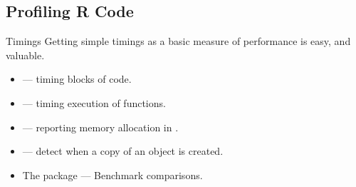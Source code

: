 \subsection{Profiling R Code}
\makesubcontentsslidessec


\begin{frame}
  \begin{block}{Timings}
  Getting simple timings as a basic measure of performance is easy, and 
valuable.
  \begin{itemize}
    \item {} --- timing blocks of code.
    \item {} --- timing execution of \R functions.
    \item {} --- reporting memory allocation in \R.
    \item {} --- detect when a copy of an \R object is created.
    \item The  package --- Benchmark comparisons.
  \end{itemize}
  \end{block}
\end{frame}


% 
